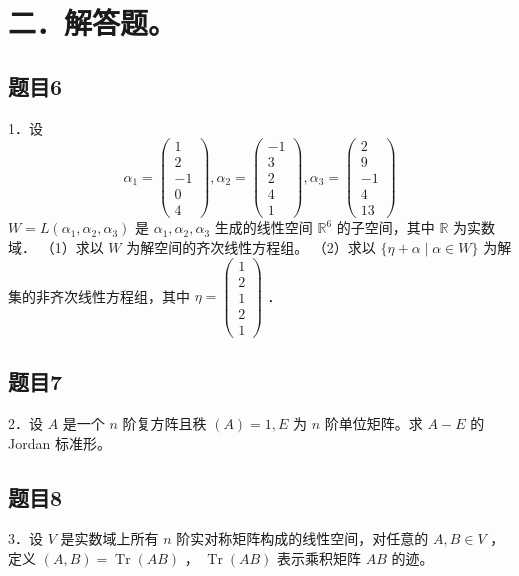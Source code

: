 \documentclass{article}
\begin{document}
\section*{二．解答题。}

\subsection{题目6}
1．设
\[
\alpha_{1}=\left(\begin{array}{c}
1 \\
2 \\
-1 \\
0 \\
4
\end{array}\right), \alpha_{2}=\left(\begin{array}{c}
-1 \\
3 \\
2 \\
4 \\
1
\end{array}\right), \alpha_{3}=\left(\begin{array}{c}
2 \\
9 \\
-1 \\
4 \\
13
\end{array}\right)
\]
\(W=L\left(\alpha_{1}, \alpha_{2}, \alpha_{3}\right)\) 是 \(\alpha_{1}, \alpha_{2}, \alpha_{3}\) 生成的线性空间 \(\mathbb{R}^{6}\) 的子空间，其中 \(\mathbb{R}\) 为实数域．
（1）求以 \(W\) 为解空间的齐次线性方程组。
（2）求以 \(\{\eta+\alpha \mid \alpha \in W\}\) 为解集的非齐次线性方程组，其中 \(\eta=\left(\begin{array}{c}1 \\ 2 \\ 1 \\ 2 \\ 1\end{array}\right)\) ．

\subsection{题目7}
2．设 \(A\) 是一个 \(n\) 阶复方阵且秩 \((A)=1, E\) 为 \(n\) 阶单位矩阵。求 \(A-E\) 的 Jordan 标准形。

\subsection{题目8}
3．设 \(V\) 是实数域上所有 \(n\) 阶实对称矩阵构成的线性空间，对任意的 \(A, B \in V\) ，定义 \((A, B)=\operatorname{Tr}(A B)\) ， \(\operatorname{Tr}(A B)\) 表示乘积矩阵 \(A B\) 的迹。
\end{document}
